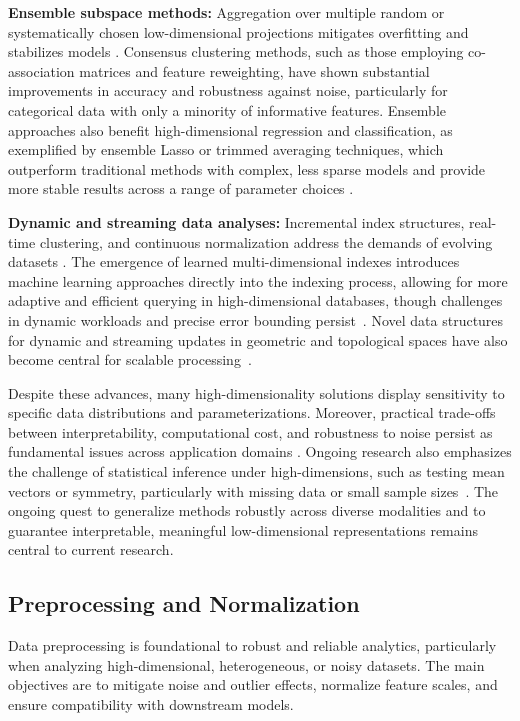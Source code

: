 \documentclass[sigconf]{acmart}
\begin{document}
\textbf{Ensemble subspace methods:} Aggregation over multiple random or systematically chosen low-dimensional projections mitigates overfitting and stabilizes models \cite{ref116}. Consensus clustering methods, such as those employing co-association matrices and feature reweighting, have shown substantial improvements in accuracy and robustness against noise, particularly for categorical data with only a minority of informative features. Ensemble approaches also benefit high-dimensional regression and classification, as exemplified by ensemble Lasso or trimmed averaging techniques, which outperform traditional methods with complex, less sparse models and provide more stable results across a range of parameter choices \cite{ref97,ref116}.

\textbf{Dynamic and streaming data analyses:} Incremental index structures, real-time clustering, and continuous normalization address the demands of evolving datasets \cite{ref76,ref79,ref80,ref94}. The emergence of learned multi-dimensional indexes introduces machine learning approaches directly into the indexing process, allowing for more adaptive and efficient querying in high-dimensional databases, though challenges in dynamic workloads and precise error bounding persist~\cite{ref110}. Novel data structures for dynamic and streaming updates in geometric and topological spaces have also become central for scalable processing~\cite{ref76,ref79,ref80}.

Despite these advances, many high-dimensionality solutions display sensitivity to specific data distributions and parameterizations. Moreover, practical trade-offs between interpretability, computational cost, and robustness to noise persist as fundamental issues across application domains \cite{ref91,ref94,ref95}. Ongoing research also emphasizes the challenge of statistical inference under high-dimensions, such as testing mean vectors or symmetry, particularly with missing data or small sample sizes~\cite{ref91,ref94,ref95}. The ongoing quest to generalize methods robustly across diverse modalities and to guarantee interpretable, meaningful low-dimensional representations remains central to current research.

\subsection{Preprocessing and Normalization}

Data preprocessing is foundational to robust and reliable analytics, particularly when analyzing high-dimensional, heterogeneous, or noisy datasets. The main objectives are to mitigate noise and outlier effects, normalize feature scales, and ensure compatibility with downstream models.
\end{document}

